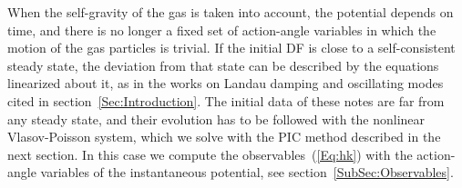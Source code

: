 When the self-gravity of the gas is taken into account, the potential depends on time, and there is no longer a fixed set of action-angle variables in which the motion of the gas particles is trivial. If the initial DF is close to a self-consistent steady state, the deviation from that state can be described by the equations linearized about it, as in the works on Landau damping and oscillating modes cited in section~\ref{Sec:Introduction}. The initial data of these notes are far from any steady state, and their evolution has to be followed with the nonlinear Vlasov-Poisson system, which we solve with the PIC method described in the next section. In this case we compute the observables~(\ref{Eq:hk}) with the action-angle variables of the instantaneous potential, see section~\ref{SubSec:Observables}.
